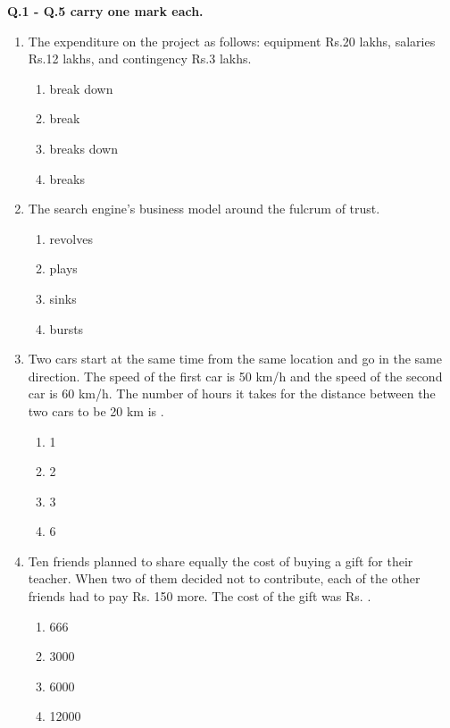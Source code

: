 \documentclass[12pt]{article}
\begin{document}
\noindent\textbf{Q.1 - Q.5 carry one mark each.}
\begin{enumerate}[label=Q.\arabic*]
	\item The expenditure on the project \underline{\hspace{2cm}}as follows: equipment Rs.20 lakhs, salaries Rs.12 lakhs, and contingency Rs.3 lakhs.
\begin{multicols}{2}
\begin{enumerate}[label=(\Alph*)]
\item break down
\item break
\item breaks down
\item breaks
\end{enumerate}
\end{multicols}

\item The search engine's business model \underline{\hspace{2cm}} around the fulcrum of trust.
\begin{multicols}{2}
\begin{enumerate}[label=(\Alph*)]
\item revolves
\item plays
\item sinks
\item bursts
\end{enumerate}
\end{multicols}

\item Two cars start at the same time from the same location and go in the same direction. The speed of the first car is 50 km/h and the speed of the second car is 60 km/h. The number of hours it takes for the distance between the two cars to be 20 km is \underline{\hspace{2cm}}.
\begin{multicols}{2}
\begin{enumerate}[label=(\Alph*)]
\item 1
\item 2
\item 3
\item 6
\end{enumerate}
\end{multicols}

\item Ten friends planned to share equally the cost of buying a gift for their teacher. When two of them decided not to contribute, each of the other friends had to pay Rs. 150 more. The cost of the gift was Rs. \underline{\hspace{2cm}}.
\begin{multicols}{2}
\begin{enumerate}[label=(\Alph*)]
\item 666
\item 3000
\item 6000
\item 12000
\end{enumerate}
\end{multicols}


\end{enumerate}
\end{document}
